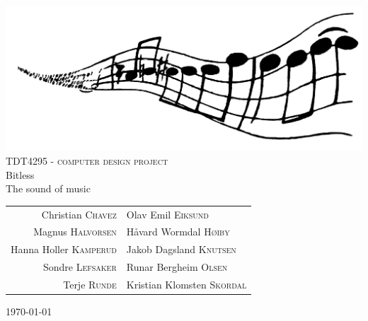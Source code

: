\begin{titlepage}

\begin{center}

    \includegraphics[scale=0.05]{./figures/logo}\\[1cm]

\textsc{\LARGE TDT4295 - computer design project}\\[0.2cm]


{\huge Bitless}\\[0.2cm]
\small{The sound of music}\\[1cm]

\begin{table}[h]
\centering
\begin{tabular}{rl}
Christian \textsc{Chavez}			& Olav Emil \textsc{Eiksund} \\
Magnus \textsc{Halvorsen}		& Håvard Wormdal \textsc{Høiby} \\
Hanna Holler \textsc{Kamperud}		& Jakob Dagsland \textsc{Knutsen} \\
Sondre \textsc{Lefsaker}			& Runar Bergheim \textsc{Olsen} \\
Terje \textsc{Runde}			& Kristian Klomsten \textsc{Skordal}
\end{tabular}
\end{table}

\vfill
\large{\today}

\end{center}

\end{titlepage}
